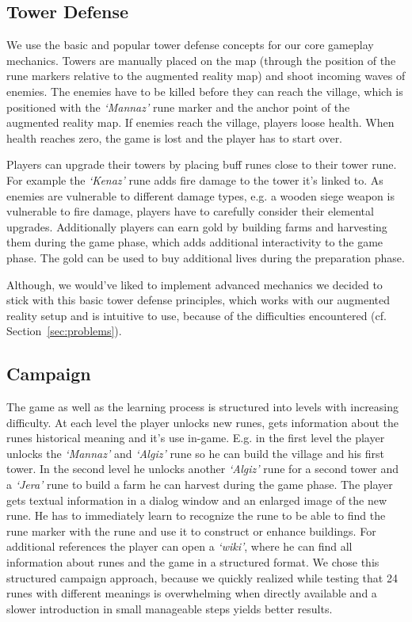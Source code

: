 
\subsection{Tower Defense}
\label{sec:game_design:subsec:tower_defense}

We use the basic and popular tower defense concepts for our core gameplay mechanics. Towers are manually placed on the map (through the position of the rune markers relative to the augmented reality map) and shoot incoming waves of enemies. The enemies have to be killed before they can reach the village, which is positioned with the \textit{`Mannaz'} rune marker and the anchor point of the augmented reality map.
If enemies reach the village, players loose health. When health reaches zero, the game is lost and the player has to start over.

Players can upgrade their towers by placing buff runes close to their tower rune. For example the \textit{`Kenaz'} rune adds fire damage to the tower it's linked to.
As enemies are vulnerable to different damage types, e.g. a wooden siege weapon is vulnerable to fire damage, players have to carefully consider their elemental upgrades.
Additionally players can earn gold by building farms and harvesting them during the game phase, which adds additional interactivity to the game phase.
The gold can be used to buy additional lives during the preparation phase.

Although, we would've liked to implement advanced mechanics we decided to stick with this basic tower defense principles, which works with our augmented reality setup and is intuitive to use, because of the difficulties encountered (cf. Section~\ref{sec:problems}).


\subsection{Campaign}
\label{sec:game_design:subsec:campaign}

The game as well as the learning process is structured into levels with increasing difficulty. At each level the player unlocks new runes, gets information about the runes historical meaning and it's use in-game.
E.g. in the first level the player unlocks the \textit{`Mannaz'} and \textit{`Algiz'} rune so he can build the village and his first tower. In the second level he unlocks another \textit{`Algiz'} rune for a second tower and a \textit{`Jera'} rune to build a farm he can harvest during the game phase.
The player gets textual information in a dialog window and an enlarged image of the new rune.
He has to immediately learn to recognize the rune to be able to find the rune marker with the rune and use it to construct or enhance buildings.
For additional references the player can open a \textit{`wiki'}, where he can find all information about runes and the game in a structured format.
We chose this structured campaign approach, because we quickly realized while testing that 24 runes with different meanings is overwhelming when directly available and a slower introduction in small manageable steps yields better results.


